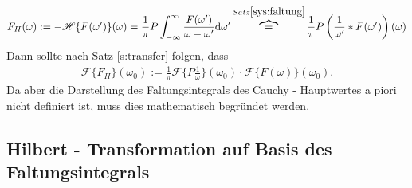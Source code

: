 \begin{align}
	F_H(\omega):=-\mathscr{H}\{F(\omega')\}{(\omega)} = \frac{1}{\pi} P \int_{-\infty}^{\infty} \frac{F(\omega')}{\omega - \omega'} \mathrm{d\omega'} \overbrace{=}^{Satz \ref{sys:faltung}} \frac{1}{\pi} P \left(\frac{1}{\omega'} * F(\omega')\right)(\omega)
\end{align}
Dann sollte nach Satz \ref{s:transfer} folgen, dass
\begin{align}
	\mathscr{F}\{F_H\}(\omega_0):= \frac{1}{\pi}\mathscr{F}\{P \frac{1}{\omega}\}(\omega_0) \cdot \mathscr{F}\{F(\omega)\}{(\omega_0)} \text{.}
\end{align}
Da aber die Darstellung des Faltungsintegrals des Cauchy - Hauptwertes a piori nicht definiert ist, muss dies mathematisch begründet werden. 
\subsection{Hilbert - Transformation auf Basis des Faltungsintegrals}
